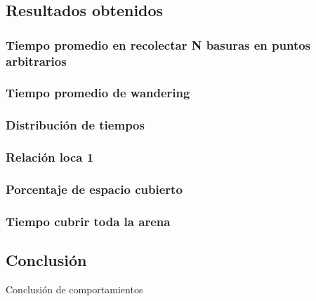 \subsection{Resultados obtenidos}
\label{results}

\subsubsection{Tiempo promedio en recolectar N basuras en puntos arbitrarios}

\subsubsection{Tiempo promedio de wandering}

\subsubsection{Distribuci\'on de tiempos}

\subsubsection{Relaci\'on loca 1}

\subsubsection{Porcentaje de espacio cubierto}

\subsubsection{Tiempo cubrir toda la arena}

\subsection{Conclusi\'on}
Conclusi\'on de comportamientos

